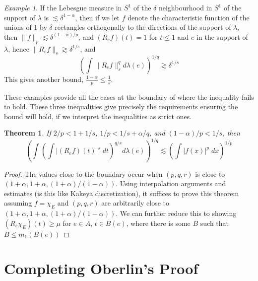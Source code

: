 \documentclass{article}
\theoremstyle{plain}
\newtheorem{theorem}{Theorem}
\theoremstyle{remark}
\newtheorem*{example}{Example}
\theoremstyle{definition}
\begin{document}
\begin{example}
	If the Lebesgue measure in $S^1$ of the $\delta$ neighbourhood in $S^1$ of the support of $\lambda$ is $\lesssim \delta^{1-\alpha}$, then if we let $f$ denote the characteristic function of the unions of 1 by $\delta$ rectangles orthogonally to the directions of the support of $\lambda$, then $\| f \|_p \lesssim \delta^{(1 - \alpha)/p}$, and $(R_e f)(t) = 1$ for $t \leq 1$ and $e$ in the support of $\lambda$, hence $\| R_e f \|_s \gtrsim \delta^{1/s}$, and
	\[ \left( \int \| R_e f \|_s^q d\lambda(e) \right)^{1/q} \gtrsim \delta^{1/s} \]
	This gives another bound, $\frac{1 - \alpha}{p} \leq \frac{1}{s}$.
\end{example}

These examples provide all the cases at the boundary of where the inequality fails to hold. These three inequalities give precisely the requirements ensuring the bound will hold, if we interpret the inequalities as strict ones.

\begin{theorem}
	If $2/p < 1 + 1/s$, $1/p < 1/s + \alpha/q$, and $(1-\alpha)/p < 1/s$, then
	\[ \left( \int \left( \int |(R_e f)(t)|^s\; dt \right)^{q/s} d\lambda(e) \right)^{1/q} \lesssim \left( \int |f(x)|^p\; dx \right)^{1/p} \]
\end{theorem}
\begin{proof}
	The values close to the boundary  occur when $(p,q,r)$ is close to $(1 + \alpha, 1 + \alpha, (1 + \alpha)/(1 - \alpha))$. Using interpolation arguments and estimates (is this like Kakeya discretization), it suffices to prove this theorem assuming $f = \chi_E$ and $(p,q,r)$ are arbitrarily close to $(1 + \alpha, 1 + \alpha, (1 + \alpha)/(1 - \alpha))$. We can further reduce this to showing $(R_e \chi_E)(t) \geq \mu$ for $e \in A$, $t \in B(e)$, where there is some $B$ such that $B \leq m_1(B(e))$
\end{proof}

\section{Completing Oberlin's Proof}
\end{document}
